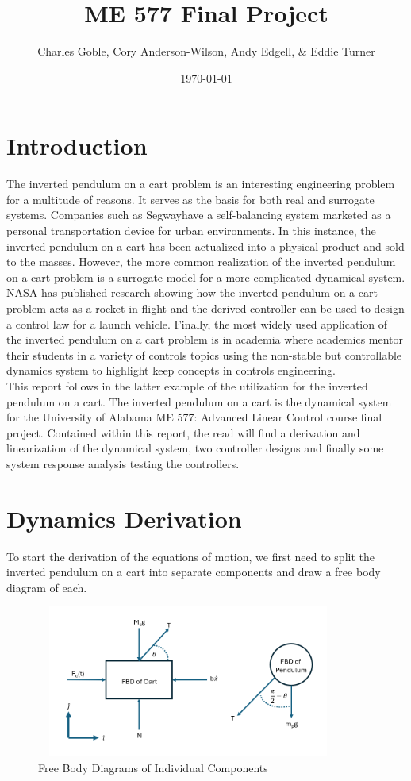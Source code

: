 \documentclass[titlepage]{article}
\title{ME 577 Final Project}
\author{Charles Goble, Cory Anderson-Wilson, Andy Edgell, \& Eddie Turner}
\date{\today}
\begin{document}
\maketitle
\tableofcontents

\newpage
\section{Introduction}
The inverted pendulum on a cart problem is an interesting engineering problem for a multitude of reasons. It serves as the basis for both real and surrogate systems. Companies such as Segway\texttrademark have a self-balancing system marketed as a personal transportation device for urban environments. In this instance, the inverted pendulum on a cart has been actualized into a physical product and sold to the masses. However, the more common realization of the inverted pendulum on a cart problem is a surrogate model for a more complicated dynamical system. NASA has published research showing how the inverted pendulum on a cart problem acts as a rocket in flight and the derived controller can be used to design a control law for a launch vehicle. Finally, the most widely used application of the inverted pendulum on a cart problem is in academia where academics mentor their students in a variety of controls topics using the non-stable but controllable dynamics system to highlight keep concepts in controls engineering.\\

This report follows in the latter example of the utilization for the inverted pendulum on a cart. The inverted pendulum on a cart is the dynamical system for the University of Alabama ME 577: Advanced Linear Control course final project. Contained within this report, the read will find a derivation and linearization of the dynamical system, two controller designs and finally some system response analysis testing the controllers.

\section{Dynamics Derivation}
To start the derivation of the equations of motion, we first need to split the inverted pendulum on a cart into separate components and draw a free body diagram of each.

\begin{figure}[H]
\center
\includegraphics[width=10cm, height=5cm]{free_body_diagram.png}
\caption{Free Body Diagrams of Individual Components}
\end{figure}
\end{document}
